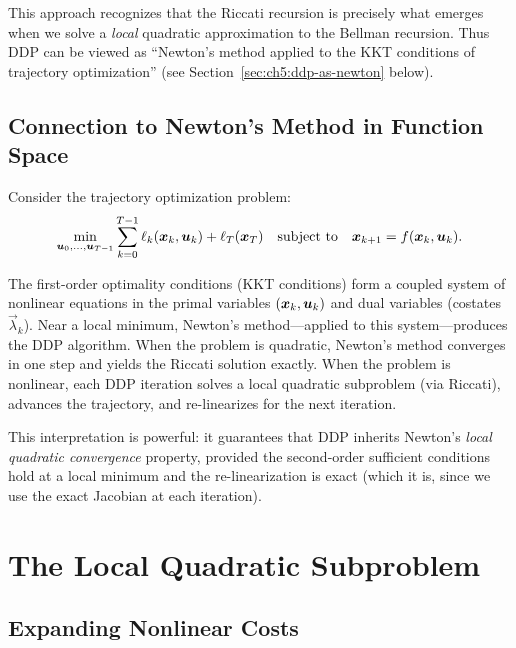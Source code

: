 This approach recognizes that the Riccati recursion is precisely what emerges when we solve a \emph{local}
quadratic approximation to the Bellman recursion. Thus DDP can be viewed as ``Newton's method applied to
the KKT conditions of trajectory optimization'' (see Section~\ref{sec:ch5:ddp-as-newton} below).

\subsection{Connection to Newton's Method in Function Space}

Consider the trajectory optimization problem:
\begin{equation}
\min_{\bm{u}_0,\ldots,\bm{u}_{T-1}} \sum_{k=0}^{T-1} \ell_k(\bm{x}_k,\bm{u}_k) + \ell_T(\bm{x}_T)
\quad \text{subject to} \quad \bm{x}_{k+1} = f(\bm{x}_k,\bm{u}_k).
\label{eq:ch5:traj-opt}
\end{equation}

The first-order optimality conditions (KKT conditions) form a coupled system of nonlinear equations
in the primal variables $(\bm{x}_k,\bm{u}_k)$ and dual variables (costates $\vec{\lambda}_k$). Near a local
minimum, Newton's method---applied to this system---produces the DDP algorithm. When the problem is
quadratic, Newton's method converges in one step and yields the Riccati solution exactly. When the
problem is nonlinear, each DDP iteration solves a local quadratic subproblem (via Riccati), advances
the trajectory, and re-linearizes for the next iteration.

This interpretation is powerful: it guarantees that DDP inherits Newton's \emph{local quadratic convergence}
property, provided the second-order sufficient conditions hold at a local minimum and the re-linearization
is exact (which it is, since we use the exact Jacobian at each iteration).

\section{The Local Quadratic Subproblem}

\subsection{Expanding Nonlinear Costs}

